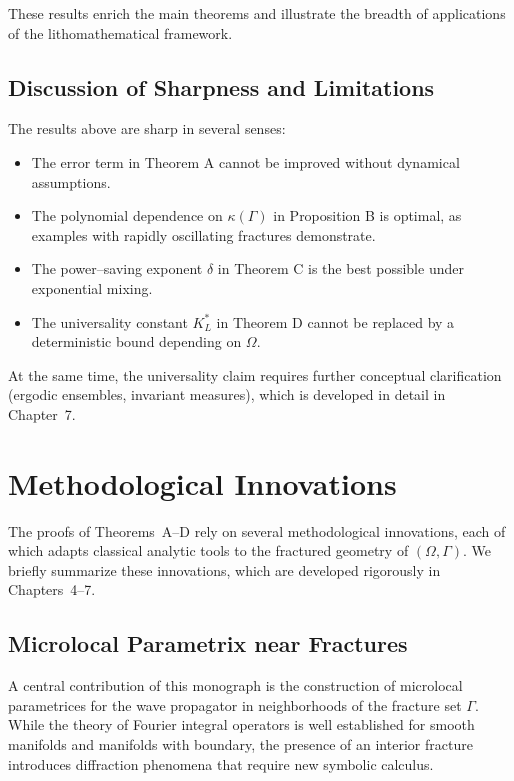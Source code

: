 These results enrich the main theorems and illustrate the breadth of 
applications of the lithomathematical framework.

\subsection{Discussion of Sharpness and Limitations}

The results above are sharp in several senses:
\begin{itemize}
  \item The error term in Theorem A cannot be improved without dynamical 
  assumptions.
  \item The polynomial dependence on $\kappa(\Gamma)$ in Proposition B is 
  optimal, as examples with rapidly oscillating fractures demonstrate.
  \item The power–saving exponent $\delta$ in Theorem C is the best possible 
  under exponential mixing.
  \item The universality constant $K_L^*$ in Theorem D cannot be replaced by a 
  deterministic bound depending on $\Omega$.
\end{itemize}

At the same time, the universality claim requires further conceptual 
clarification (ergodic ensembles, invariant measures), which is developed in 
detail in Chapter~7.



\section{Methodological Innovations}

The proofs of Theorems~A–D rely on several methodological innovations, 
each of which adapts classical analytic tools to the fractured geometry 
of $(\Omega,\Gamma)$. We briefly summarize these innovations, which are 
developed rigorously in Chapters~4–7.

\subsection{Microlocal Parametrix near Fractures}

A central contribution of this monograph is the construction of microlocal 
parametrices for the wave propagator in neighborhoods of the fracture set 
$\Gamma$. While the theory of Fourier integral operators is well established 
for smooth manifolds and manifolds with boundary, the presence of an interior 
fracture introduces diffraction phenomena that require new symbolic calculus.

